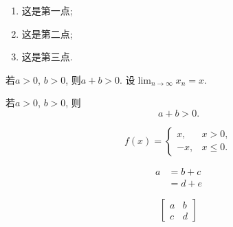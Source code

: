 \documentclass[fontset=windows]{article}
\begin{document}
\begin{enumerate}
    \item[(1)] 这是第一点; 
    \item[(2)] 这是第二点;
    \item[(3)] 这是第三点. 
\end{enumerate}

若$a>0$, $b>0$, 则$a+b>0$.
设$\displaystyle\lim_{n\to\infty}x_n=x$.

若$a>0$, $b>0$, 则
$$
a+b>0.
$$

$$
f(x)=\begin{cases}
    x, & x>0, \\
    -x, & x\leq 0.
\end{cases}
$$

$$
\begin{aligned}
a & =b+c \\
& =d+e
\end{aligned}
$$

$$
\begin{bmatrix}
    a & b \\
    c & d
\end{bmatrix}
$$

\newpage


\end{document}
